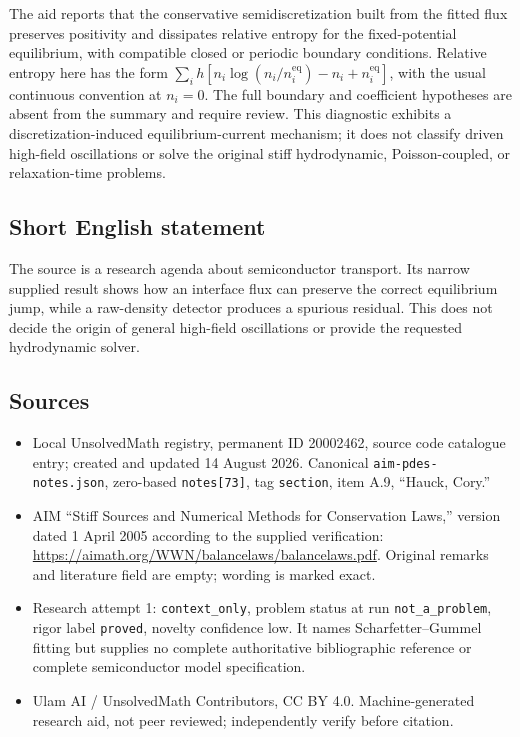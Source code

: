 \documentclass[11pt]{article}
\begin{document}
The aid reports that the conservative semidiscretization built from the fitted flux preserves positivity and dissipates relative entropy for the fixed-potential equilibrium, with compatible closed or periodic boundary conditions. Relative entropy here has the form $\sum_i h[n_i\log(n_i/n_i^{\mathrm{eq}})-n_i+n_i^{\mathrm{eq}}]$, with the usual continuous convention at $n_i=0$. The full boundary and coefficient hypotheses are absent from the summary and require review. This diagnostic exhibits a discretization-induced equilibrium-current mechanism; it does not classify driven high-field oscillations or solve the original stiff hydrodynamic, Poisson-coupled, or relaxation-time problems.
\subsection{Short English statement}
The source is a research agenda about semiconductor transport. Its narrow supplied result shows how an interface flux can preserve the correct equilibrium jump, while a raw-density detector produces a spurious residual. This does not decide the origin of general high-field oscillations or provide the requested hydrodynamic solver.
\subsection{Sources}
\begin{itemize}
\item Local UnsolvedMath registry, permanent ID 20002462, source code catalogue entry; created and updated 14 August 2026. Canonical \texttt{aim-pdes-notes.json}, zero-based \texttt{notes[73]}, tag \texttt{section}, item A.9, ``Hauck, Cory.''
\item AIM ``Stiff Sources and Numerical Methods for Conservation Laws,'' version dated 1 April 2005 according to the supplied verification: \url{https://aimath.org/WWN/balancelaws/balancelaws.pdf}. Original remarks and literature field are empty; wording is marked exact.
\item Research attempt 1: \texttt{context\_only}, problem status at run \texttt{not\_a\_problem}, rigor label \texttt{proved}, novelty confidence low. It names Scharfetter--Gummel fitting but supplies no complete authoritative bibliographic reference or complete semiconductor model specification.
\item Ulam AI / UnsolvedMath Contributors, CC BY 4.0. Machine-generated research aid, not peer reviewed; independently verify before citation.
\end{itemize}
\end{document}
